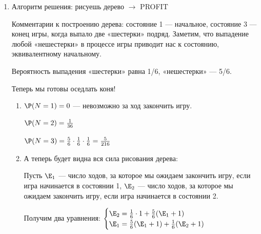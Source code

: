 \begin{enumerate}
\item
Алгоритм решения: рисуешь дерево $\rightarrow$ PROFIT

\begin{center}


\end{center}

Комментарии к построению дерева: состояние 1 — начальное, состояние 3 — конец игры, когда выпало две «шестерки» подряд. Заметим, что выпадение любой «нешестерки» в процессе игры приводит нас к состоянию, эквивалентному начальному.

Вероятность выпадения «шестерки» равна 1/6, «нешестерки» — 5/6.

Теперь мы готовы оседлать коня!

\begin{enumerate}
\item $\P(N = 1) = 0$ — невозможно за ход закончить игру.

$\P(N = 2) = \frac{1}{36}$

$\P(N = 3) = \frac{5}{6} \cdot \frac{1}{6} \cdot \frac{1}{6} = \frac{5}{216}$

\item А теперь будет видна вся сила рисования дерева:

Пусть $\E_1$ — число ходов, за которое мы ожидаем закончить игру, если игра начинается в состоянии 1, $\E_2$ — число ходов, за которое мы ожидаем закончить игру, если игра начинается в состоянии 2.

Получим два уравнения:
$\begin{cases} \E_2 = \frac{1}{6} \cdot 1 +  \frac{5}{6} (\E_1 + 1)   \\ \E_1 =  \frac{5}{6} (\E_1 + 1) + \frac{1}{6} ( \E_2 + 1) \end{cases} $


\end{enumerate}
\end{enumerate}
